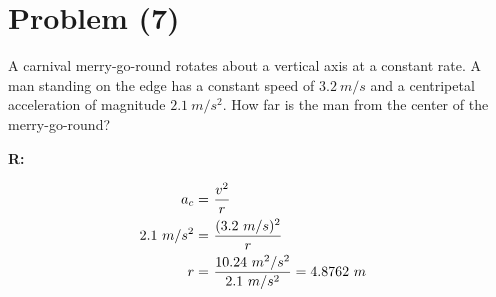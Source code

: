 \section{Problem (7)}
	A carnival merry-go-round rotates about a vertical axis at a constant rate. A man standing on the edge has a constant speed of $3.2 \ m/s$ and a centripetal acceleration of magnitude $2.1 \ m/s^{2}$. How far is the man from the center of the merry-go-round?

	\textbf{R:} \newline

	\begin{align}
		a_{c} = \ &\frac{v^{2}}{r}& \notag \\
		2.1 \ m/s^{2} = \ &\frac{(3.2 \ m/s)^{2}}{r}& \notag \\
		r = \ &\frac{10.24 \ m^{2}/s^{2}}{2.1 \ m/s^{2}} = 4.8762 \ m&
	\end{align}

